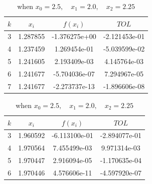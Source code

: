 \documentclass{article}
\begin{document}

\begin{table}
\begin{minipage}[c]{0.48\textwidth}
\caption{when $x_0 = 0.5 ,\quad x_1 = 1.0 ,\quad x_2 = 1.5$}
\begin{tabular}{c c c c} 
 \hline
 \hline
$k$ & $x_i$ & $f(x_i)$ & $TOL$\\ \hline
3 & 1.287855 &-1.376275e+00 &-2.121453e-01\\ \hline
4 & 1.237459 &1.269454e-01 &-5.039599e-02\\ \hline
5 & 1.241605 &2.193409e-03 &4.145764e-03\\ \hline
6 & 1.241677 &-5.704036e-07 &7.294967e-05\\ \hline
7 & 1.241677 &-2.273737e-13 &-1.896606e-08\\ \hline
\hline
\end{tabular}
\end{minipage}
\begin{minipage}[c]{0.6\textwidth}
\centering
\caption{when $x_0 = 2.5 ,\quad x_1 = 2.0 ,\quad x_2 = 2.25$}
 \begin{tabular}{c c c c} 
 \hline
 \hline
$k$ & $x_i$ & $f(x_i)$ & $TOL$\\ \hline
3 & 1.960592 &-6.113100e-01 &-2.894077e-01\\ \hline
4 & 1.970564 &7.455499e-03 &9.971314e-03\\ \hline
5 & 1.970447 &2.916094e-05 &-1.170635e-04\\ \hline
6 & 1.970446 &4.576606e-11 &-4.597920e-07\\ \hline
\hline
\end{tabular}
\end{minipage}
\end{table}
\end{document}
